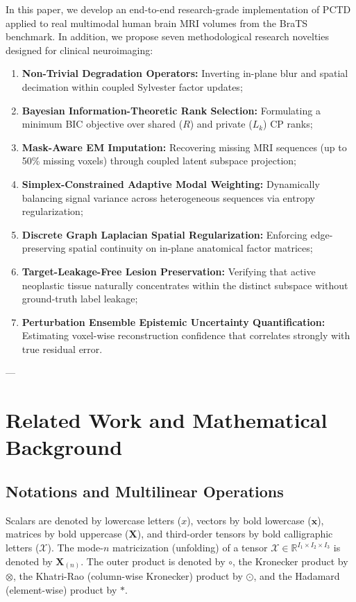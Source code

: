 \documentclass[11pt,a4paper]{article}
\begin{document}
In this paper, we develop an end-to-end research-grade implementation of PCTD applied to real multimodal human brain MRI volumes from the BraTS benchmark. In addition, we propose seven methodological research novelties designed for clinical neuroimaging:
\begin{enumerate}[label=(\arabic*)]
    \item \textbf{Non-Trivial Degradation Operators:} Inverting in-plane blur and spatial decimation within coupled Sylvester factor updates;
    \item \textbf{Bayesian Information-Theoretic Rank Selection:} Formulating a minimum BIC objective over shared ($R$) and private ($L_k$) CP ranks;
    \item \textbf{Mask-Aware EM Imputation:} Recovering missing MRI sequences (up to 50\% missing voxels) through coupled latent subspace projection;
    \item \textbf{Simplex-Constrained Adaptive Modal Weighting:} Dynamically balancing signal variance across heterogeneous sequences via entropy regularization;
    \item \textbf{Discrete Graph Laplacian Spatial Regularization:} Enforcing edge-preserving spatial continuity on in-plane anatomical factor matrices;
    \item \textbf{Target-Leakage-Free Lesion Preservation:} Verifying that active neoplastic tissue naturally concentrates within the distinct subspace without ground-truth label leakage;
    \item \textbf{Perturbation Ensemble Epistemic Uncertainty Quantification:} Estimating voxel-wise reconstruction confidence that correlates strongly with true residual error.
\end{enumerate}

---

\section{Related Work and Mathematical Background}
\label{sec:related}

\subsection{Notations and Multilinear Operations}
Scalars are denoted by lowercase letters ($x$), vectors by bold lowercase ($\mathbf{x}$), matrices by bold uppercase ($\mathbf{X}$), and third-order tensors by bold calligraphic letters ($\bm{\mathcal{X}}$). The mode-$n$ matricization (unfolding) of a tensor $\bm{\mathcal{X}} \in \mathbb{R}^{I_1 \times I_2 \times I_3}$ is denoted by $\mathbf{X}_{(n)}$. The outer product is denoted by $\circ$, the Kronecker product by $\otimes$, the Khatri-Rao (column-wise Kronecker) product by $\odot$, and the Hadamard (element-wise) product by $*$. 
\end{document}
